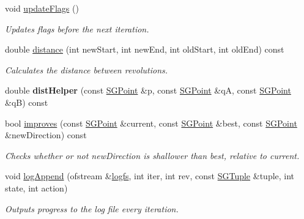 \begin{DoxyCompactItemize}
void \hyperlink{classSGApprox_a93455458a21bdeccff21a6163932c38a}{update\+Flags} ()
\begin{DoxyCompactList}\small\item\em Updates flags before the next iteration. \end{DoxyCompactList}\item 
double \hyperlink{classSGApprox_ae546360183bac3a32bc3fcb57cb81294}{distance} (int new\+Start, int new\+End, int old\+Start, int old\+End) const
\begin{DoxyCompactList}\small\item\em Calculates the distance between revolutions. \end{DoxyCompactList}\item 
\mbox{\label{classSGApprox_ab123c62f0f56551cd56a843f273a29c1}} 
double {\bfseries dist\+Helper} (const \hyperlink{classSGPoint}{S\+G\+Point} \&p, const \hyperlink{classSGPoint}{S\+G\+Point} \&qA, const \hyperlink{classSGPoint}{S\+G\+Point} \&qB) const
\item 
bool \hyperlink{classSGApprox_a1f34b002a7000a29338425ed4b452d86}{improves} (const \hyperlink{classSGPoint}{S\+G\+Point} \&current, const \hyperlink{classSGPoint}{S\+G\+Point} \&best, const \hyperlink{classSGPoint}{S\+G\+Point} \&new\+Direction) const
\begin{DoxyCompactList}\small\item\em Checks whether or not new\+Direction is shallower than best, relative to current. \end{DoxyCompactList}\item 
\mbox{\label{classSGApprox_a91be640b991ff44b56359cbe3a2b00d5}} 
void \hyperlink{classSGApprox_a91be640b991ff44b56359cbe3a2b00d5}{log\+Append} (ofstream \&\hyperlink{classSGApprox_aa95ff6bda46617fbaa7cf1c8d6708748}{logfs}, int iter, int rev, const \hyperlink{classSGTuple}{S\+G\+Tuple} \&tuple, int state, int action)
\begin{DoxyCompactList}\small\item\em Outputs progress to the log file every iteration. \end{DoxyCompactList}\end{DoxyCompactItemize}

